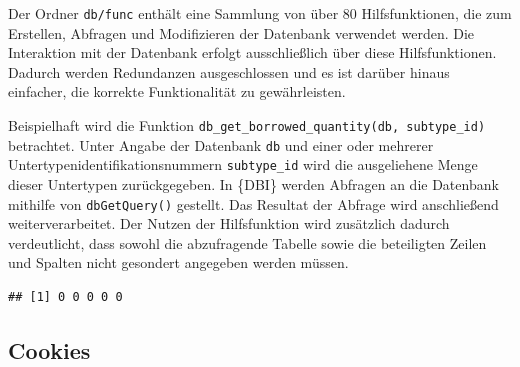 \documentclass[
]{article}
\newenvironment{Shaded}{\begin{snugshade}}{\end{snugshade}}
\newcommand{\AttributeTok}[1]{\textcolor[rgb]{0.77,0.63,0.00}{#1}}
\newcommand{\CommentTok}[1]{\textcolor[rgb]{0.56,0.35,0.01}{\textit{#1}}}
\newcommand{\ControlFlowTok}[1]{\textcolor[rgb]{0.13,0.29,0.53}{\textbf{#1}}}
\newcommand{\DecValTok}[1]{\textcolor[rgb]{0.00,0.00,0.81}{#1}}
\newcommand{\FunctionTok}[1]{\textcolor[rgb]{0.00,0.00,0.00}{#1}}
\newcommand{\NormalTok}[1]{#1}
\newcommand{\OtherTok}[1]{\textcolor[rgb]{0.56,0.35,0.01}{#1}}
\newcommand{\SpecialCharTok}[1]{\textcolor[rgb]{0.00,0.00,0.00}{#1}}
\newcommand{\StringTok}[1]{\textcolor[rgb]{0.31,0.60,0.02}{#1}}
\begin{document}
Der Ordner \texttt{db/func} enthält eine Sammlung von über 80 Hilfsfunktionen, die zum Erstellen, Abfragen und Modifizieren der Datenbank verwendet werden. Die Interaktion mit der Datenbank erfolgt ausschließlich über diese Hilfsfunktionen. Dadurch werden Redundanzen ausgeschlossen und es ist darüber hinaus einfacher, die korrekte Funktionalität zu gewährleisten.

Beispielhaft wird die Funktion \texttt{db\_get\_borrowed\_quantity(db,\ subtype\_id)} betrachtet. Unter Angabe der Datenbank \texttt{db} und einer oder mehrerer Untertypenidentifikationsnummern \texttt{subtype\_id} wird die ausgeliehene Menge dieser Untertypen zurückgegeben. In \{DBI\} werden Abfragen an die Datenbank mithilfe von \texttt{dbGetQuery()} gestellt. Das Resultat der Abfrage wird anschließend weiterverarbeitet. Der Nutzen der Hilfsfunktion wird zusätzlich dadurch verdeutlicht, dass sowohl die abzufragende Tabelle sowie die beteiligten Zeilen und Spalten nicht gesondert angegeben werden müssen.

\begin{Shaded}
\end{Shaded}

\begin{verbatim}
## [1] 0 0 0 0 0
\end{verbatim}

\hypertarget{cookies}{%
\subsection{Cookies}\label{cookies}}
\end{document}
